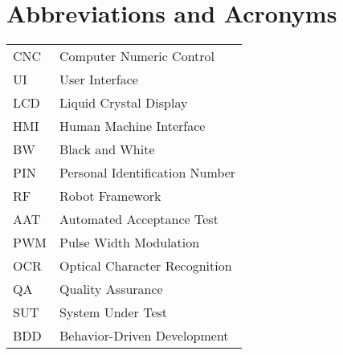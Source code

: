 
\chapter*{Abbreviations and Acronyms}


\noindent
\begin{longtable}{@{}p{}p{}@{}}
CNC & Computer Numeric Control \\
UI & User Interface \\
LCD & Liquid Crystal Display \\
HMI & Human Machine Interface \\
BW & Black and White \\
PIN & Personal Identification Number \\
RF & Robot Framework \\
AAT & Automated Acceptance Test \\
PWM & Pulse Width Modulation \\
OCR & Optical Character Recognition \\
QA & Quality Assurance \\
SUT & System Under Test \\
BDD & Behavior-Driven Development \\

\end{longtable}
